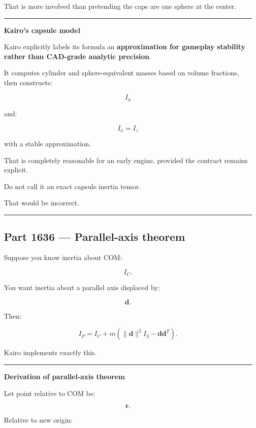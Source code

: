 That is more involved than pretending the caps are one sphere at the center.

\begin{center}\rule{0.5\linewidth}{0.5pt}\end{center}

\textbf{Kairo's capsule model}

Kairo explicitly labels its formula an \textbf{approximation for gameplay stability rather than CAD-grade analytic precision}.

It computes cylinder and sphere-equivalent masses based on volume fractions, then constructs:

\[
I_y
\]

and:

\[
I_x=I_z
\]

with a stable approximation.

That is completely reasonable for an early engine, provided the contract remains explicit.

Do not call it an exact capsule inertia tensor.

That would be incorrect.

\begin{center}\rule{0.5\linewidth}{0.5pt}\end{center}

\subsection{Part 1636 --- Parallel-axis theorem}\label{06-engine-ii-ch035-part-1636-parallel-axis-theorem}

Suppose you know inertia about COM:

\[
I_C.
\]

You want inertia about a parallel axis displaced by:

\[
\mathbf{d}.
\]

Then:

\[
\boxed{
I_P
=
I_C
+
m
\left(
\|\mathbf{d}\|^2I_3
-
\mathbf{d}\mathbf{d}^T
\right).
}
\]

Kairo implements exactly this.

\begin{center}\rule{0.5\linewidth}{0.5pt}\end{center}

\textbf{Derivation of parallel-axis theorem}

Let point relative to COM be:

\[
\mathbf{r}.
\]

Relative to new origin:

